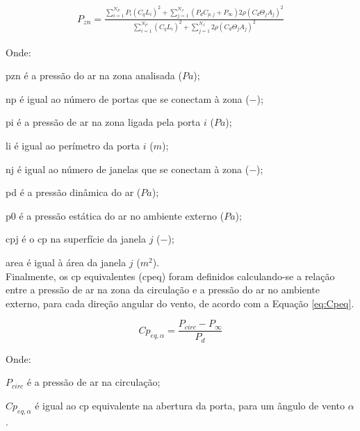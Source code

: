 \begin{equation}\label{eq:P}
\begin{split}
P_{zn} = \frac{\sum_{i=1}^{N_P}{P_{i} (C_q L_i)^2} +  %
	\sum_{j=1}^{N_J}{(P_{d} C_{p,j} + P_{\infty}) 2 \rho (C_{d} \Theta_j A_j)^2 }}
{\sum_{i=1}^{N_P}{(C_q L_i)^2} +  %
	\sum_{j=1}^{N_J}{2 \rho (C_{d} \Theta_j A_j)^2 }}
\end{split}
\end{equation}

Onde:

\gls{pzn} é a pressão do ar na zona analisada ($Pa$);

\gls{np} é igual ao número de portas que se conectam à zona ($-$);

\gls{pi} é a pressão de ar na zona ligada pela porta $i$ ($Pa$);

\gls{li} é igual ao perímetro da porta $i$ ($m$);

\gls{nj} é igual ao número de janelas que se conectam à zona ($-$);

\gls{pd} é a pressão dinâmica do ar ($Pa$);

\gls{p0} é a pressão estática do ar no ambiente externo ($Pa$);

\gls{cpj} é o \acrshort{cp} na superfície da janela $j$ ($-$);

\gls{area} é igual à área da janela $j$ ($m^2$).
\\

Finalmente, os \acrshort{cp} equivalentes (\acrshort{cpeq}) foram definidos calculando-se a relação entre a pressão de ar na zona da circulação e a pressão do ar no ambiente externo, para cada direção angular do vento, de acordo com a Equação \ref{eq:Cpeq}.

\begin{equation}\label{eq:Cpeq}
Cp_{eq,\alpha} = \frac{P_{circ}-P_{\infty}}{P_{d}}
\end{equation}

Onde:

$P_{circ}$ é a pressão de ar na circulação;

$Cp_{eq,\alpha}$ é igual ao \acrshort{cp} equivalente na abertura da porta, para um ângulo de vento $\alpha$.
\\

